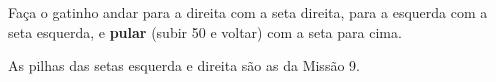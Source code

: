 \begin{desafio}
Faça o gatinho andar para a direita com a seta direita, para a esquerda com a seta esquerda, e \textbf{pular} (subir 50 e voltar) com a seta para cima.
\end{desafio}

\begin{solucao}
\begin{pilha}
\end{pilha}
As pilhas das setas esquerda e direita são as da Missão 9.
\end{solucao}
